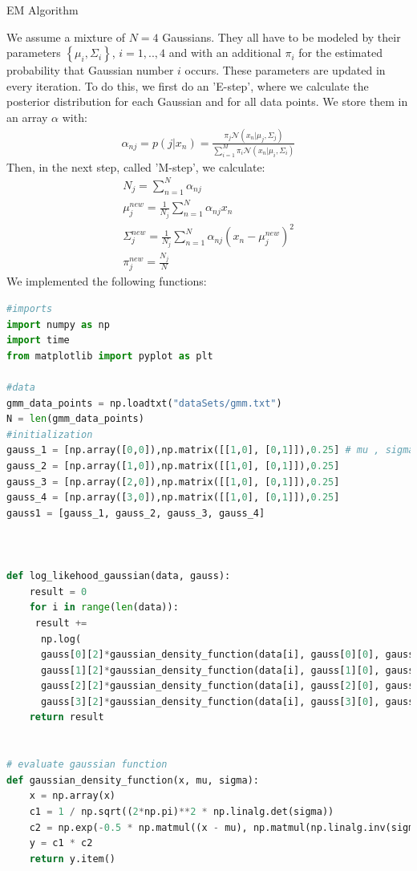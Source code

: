 \documentclass[
ngerman,
]{tudaexercise}
\begin{document}
\begin{task}{EM Algorithm}
\begin{subtask} We assume a mixture of $N=4$ Gaussians. They all have to be modeled by their parameters $\left\lbrace \mu_i , \Sigma_i\right\rbrace$, $i=1,..,4$ and with an additional $\pi_i$ for the estimated probability that Gaussian number $i$ occurs. These parameters are updated in every iteration. To do this, we first do an 'E-step', where we calculate the posterior distribution for each Gaussian and for all data points. We store them in an array $\alpha$ with: \begin{align*}
	\alpha_{nj}=p(j|x_n)=\frac{\pi_j \mathcal{N}\left( x_n|\mu_j,\Sigma_j\right) }{\sum_{i=1}^{M}\pi_i \mathcal{N}\left( x_n|\mu_i,\Sigma_i\right)}
	\end{align*}
Then, in the next step, called 'M-step', we calculate:\begin{align*}N_j=\sum_{n=1}^{N}\alpha_{nj}\\ \mu_j^{new}=\frac{1}{N_j}\sum_{n=1}^{N}\alpha_{nj}x_n\\
\Sigma_j^{new}=\frac{1}{N_j}\sum_{n=1}^{N}\alpha_{nj}\left( x_n-\mu_j^{new}\right) ^2\\
\pi_j^{new}=\frac{N_j}{N}
\end{align*}
We implemented the following functions:
\begin{lstlisting}[language=Python]
#imports
import numpy as np
import time
from matplotlib import pyplot as plt

#data
gmm_data_points = np.loadtxt("dataSets/gmm.txt")
N = len(gmm_data_points)
#initialization
gauss_1 = [np.array([0,0]),np.matrix([[1,0], [0,1]]),0.25] # mu , sigma, pi
gauss_2 = [np.array([1,0]),np.matrix([[1,0], [0,1]]),0.25]
gauss_3 = [np.array([2,0]),np.matrix([[1,0], [0,1]]),0.25]
gauss_4 = [np.array([3,0]),np.matrix([[1,0], [0,1]]),0.25]
gauss1 = [gauss_1, gauss_2, gauss_3, gauss_4]



def log_likehood_gaussian(data, gauss):
	result = 0
	for i in range(len(data)):
	 result += 
	  np.log(
	  gauss[0][2]*gaussian_density_function(data[i], gauss[0][0], gauss[0][1])+
	  gauss[1][2]*gaussian_density_function(data[i], gauss[1][0], gauss[1][1])+
  	  gauss[2][2]*gaussian_density_function(data[i], gauss[2][0], gauss[2][1])+
  	  gauss[3][2]*gaussian_density_function(data[i], gauss[3][0], gauss[3][1]))
	return result


# evaluate gaussian function
def gaussian_density_function(x, mu, sigma):
	x = np.array(x)
	c1 = 1 / np.sqrt((2*np.pi)**2 * np.linalg.det(sigma))
	c2 = np.exp(-0.5 * np.matmul((x - mu), np.matmul(np.linalg.inv(sigma),(x - mu)).T))
	y = c1 * c2
	return y.item()
	

\end{lstlisting}
\end{subtask}
\end{task}
\end{document}
